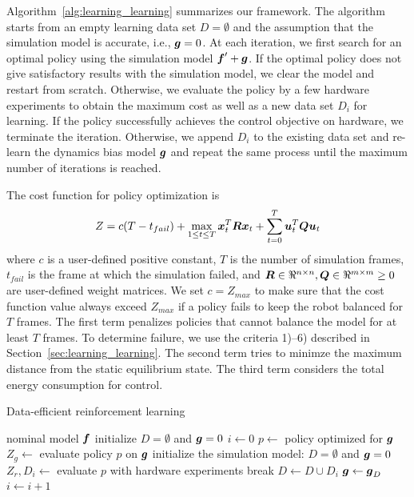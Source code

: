 
Algorithm~\ref{alg:learning_learning} summarizes our framework.
The algorithm starts from an empty learning data set $D=\emptyset$ and
the assumption that the simulation model is accurate, i.e.,
$\mbox{\boldmath \(g\)}=0$.
At each iteration, we first search for an optimal policy using
the simulation model $\mbox{\boldmath \(f\)}' + \mbox{\boldmath \(g\)}$.
If the optimal policy does not give satisfactory results with the
simulation model, we clear the model and restart from scratch.
Otherwise, we evaluate the policy by a few hardware experiments to
obtain the maximum cost as well as a new data set $D_i$ for learning.
If the policy successfully achieves the control objective on hardware,
we terminate the iteration.
Otherwise, we append $D_i$ to the existing data set and re-learn the
dynamics bias model $\mbox{\boldmath \(g\)}$ and repeat the same process until the
maximum number of iterations is reached.

The cost function for policy optimization is
\begin{equation}
Z = c (T-t_{fail}) + \max_{1\leq t \leq T} \mbox{\boldmath \(x\)}_t^T \mbox{\boldmath \(R\)}
 \mbox{\boldmath \(x\)}_t +
\sum_{t=0}^T \mbox{\boldmath \(u\)}_t^T \mbox{\boldmath \(Q\)} \mbox{\boldmath \(u\)}_t
\end{equation}
where $c$ is a user-defined positive constant, $T$ is the number of
simulation frames, $t_{fail}$ is the frame at which the simulation failed, and
$\mbox{\boldmath \(R\)}\in\Re^{n\times n},\mbox{\boldmath \(Q\)}\in\Re^{m\times m}\geq 0$ are
user-defined weight matrices. 
We set $c = Z_{max}$ to make sure that the cost function value always
exceed $Z_{max}$ if a policy fails to keep the robot balanced for $T$
frames. 
The first term penalizes policies that cannot balance the model for at
least $T$ frames. 
To determine failure, we use the criteria 1)--6) described in
Section~\ref{sec:learning_learning}.
The second term tries to minimze the maximum distance from the
static equilibrium state.
The third term considers the total energy consumption for control.


\begin{algorithm}[t]
\caption{Data-efficient reinforcement learning}
\label{alg:learning_learning}
\begin{algorithmic}[1]
\REQUIRE nominal model $\mbox{\boldmath \(f\)}$
\STATE initialize $D=\emptyset$ and $\mbox{\boldmath \(g\)} = 0$ 
\STATE $i \leftarrow 0$
\STATE $p \leftarrow$ policy optimized for $\mbox{\boldmath \(g\)}$
\STATE $Z_g \leftarrow$ evaluate policy $p$ on $\mbox{\boldmath \(g\)}$
\STATE initialize the simulation model: $D=\emptyset$ and $\mbox{\boldmath \(g\)} = 0$
\ENDIF
\STATE $Z_r, D_i \leftarrow$ evaluate $p$ with hardware experiments
\STATE break
\ENDIF
\STATE $D \leftarrow D \cup D_i$
\STATE $\mbox{\boldmath \(g\)} \leftarrow \mbox{\boldmath \(g\)}_D$ 
\STATE $i \leftarrow i+1$
\ENDWHILE
\end{algorithmic}
\end{algorithm}

